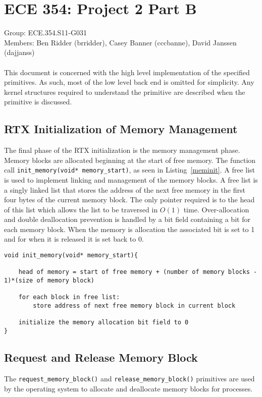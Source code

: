 \documentclass[oneside]{article}
\begin{document}
\lstset{language=C, 
        frame=single, 
        breaklines=true,
        basicstyle=\small\ttfamily,
        columns=fullflexible}
\section*{ECE 354: Project 2 Part B}
Group: ECE.354.S11-G031 \\
Members: Ben Ridder (brridder), Casey Banner (cccbanne), 
David Janssen (dajjanss) \\ \\
This document is concerned with the high level implementation of the 
specified primitives. As such, most of the low level back end is omitted for
simplicity. Any kernel structures required to understand the primitive are
described when the primitive is discussed.

\subsection*{RTX Initialization of Memory Management} 
The final phase of the RTX initialization is the memory management phase.
Memory blocks are allocated beginning at the start of free memory. The function
call \texttt{init\_memory(void* memory\_start)}, as seen in
Listing~\ref{meminit}. A free list is used to implement linking and management
of the memory blocks. A free list is a singly linked list that stores the
address of the next free memory in the first four bytes of the current memory
block. The only pointer required is to the head of this list which allows the
list to be traversed in $O(1)$ time.  Over-allocation and double deallocation
prevention is handled by a bit field containing a bit for each memory block.
When the memory is allocation the associated bit is set to 1 and for when it is
released it is set back to 0. 

\begin{lstlisting}
void init_memory(void* memory_start){
    
    head of memory = start of free memory + (number of memory blocks - 1)*(size of memory block)
    
    for each block in free list:
        store address of next free memory block in current block

    initialize the memory allocation bit field to 0
}
\end{lstlisting}

\subsection*{Request and Release Memory Block}
The \texttt{request\_memory\_block()} and \texttt{release\_memory\_block()}
primitives are used by the operating system to allocate and deallocate memory
blocks for processes.
\end{document}
